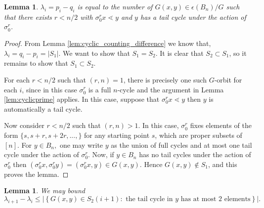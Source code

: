 \documentclass[10 pt]{amsart}
\theoremstyle{plain}
\newtheorem{lem}[thm]{Lemma}
\theoremstyle{definition}
\theoremstyle{remark}
\numberwithin{equation}{section}
\begin{document}
\begin{lem} \label{lem:bounding_sublemma1}
$\lambda_i = p_i - q_i$ is equal to the number of $G(x, y)\in \mathcal \epsilon(B_n)/G$ such that there exists $r < n/2$ with $\sigma_0^r x \lessdot y$ and $y$ has a tail cycle under the action of $\sigma_0^r$.
\end{lem}

\begin{proof}
From Lemma \ref{lem:cyclic_counting_difference} we know that,  $\lambda_i = q_i - p_i = |S_1|$. We want to show that $S_1 = S_2$. It is clear that $S_2 \subset S_1$, so it remains to show that $S_1 \subset S_2$. 

For each $r < n/2$ such that $(r, n) = 1$, there is precisely one such $G$-orbit for each $i$, since in this case $\sigma_0^r$ is a full $n$-cycle and the argument in Lemma \ref{lem:cyclicprime} applies. In this case, suppose that $\sigma_0^r x \lessdot y$ then $y$ is automatically a tail cycle. 

Now consider $r < n/2$ such that $(r, n) > 1$. In this case, $\sigma_0^r$ fixes elements of the form $\{s, s+r, s+2r, ..., \}$ for any starting point $s$, which are proper subsets of $[n]$. For $y \in B_n,$ one may write $y$ as the union of full cycles and at most one tail cycle under the action of $\sigma_0^r$. Now, if $y \in B_n$ has no tail cycles under the action of $\sigma_0^r$ then $(\sigma_0^rx , \sigma_0^ry)= (\sigma_0^rx , y) \in G(x, y).$ Hence $G(x, y) \notin S_1$, and this proves the lemma. 
\end{proof}


\begin{lem} \label{lem:bounding_sublemma2} We may bound
$$\lambda_{i+1} - \lambda_i \le | \left\{ G(x, y) \in S_2(i+1) : \text{ the tail cycle in } y \text{ has at most } 2 \text{ elements}\right\}|.$$
\end{lem}
\end{document}
